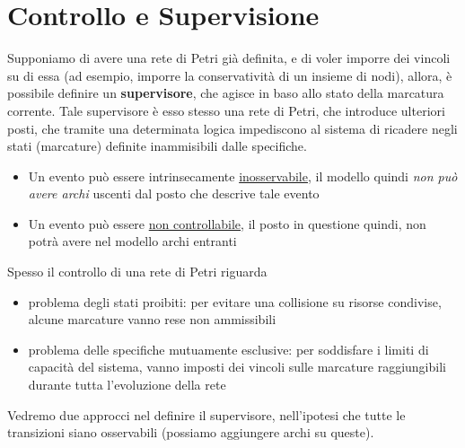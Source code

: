 \documentclass[10pt, letterpaper]{report}
\begin{document}
\section{Controllo e Supervisione}
Supponiamo di avere una rete di Petri già definita, e di voler imporre dei vincoli su di essa (ad esempio, imporre la conservatività di un insieme di nodi), allora, è possibile definire un \textbf{supervisore}, che agisce in baso allo stato della marcatura corrente. \acc 
Tale supervisore è esso stesso una rete di Petri, che introduce ulteriori posti, che tramite una determinata logica impediscono al sistema di ricadere negli stati (marcature) definite inammisibili dalle specifiche.\begin{itemize}
    \item Un evento può essere intrinsecamente \underline{inosservabile}, il modello quindi \textit{non può avere archi} uscenti dal posto che descrive tale evento 
    \item Un evento può essere \underline{non controllabile}, il posto in questione quindi, non potrà avere nel modello archi entranti 
\end{itemize}
Spesso il controllo di una rete di Petri riguarda\begin{itemize}
    \item problema degli stati proibiti: per evitare una collisione su risorse condivise, 
    alcune marcature vanno rese non ammissibili
    \item  problema delle specifiche mutuamente esclusive: per soddisfare i limiti di 
    capacità del sistema, vanno imposti dei vincoli sulle marcature raggiungibili 
    durante tutta l'evoluzione della rete
\end{itemize}
Vedremo due approcci nel definire il supervisore, nell'ipotesi che tutte le transizioni siano osservabili (possiamo aggiungere archi su queste).
\end{document}
